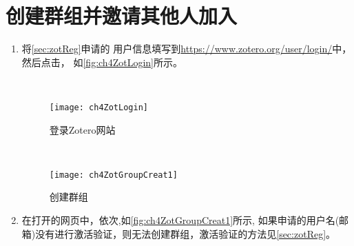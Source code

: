 \documentclass[theorem=false,mathfont=none,openany,sub3section]{easybook}
\begin{document}
\section{创建群组并邀请其他人加入}\label{sec:CreatGroup}
\begin{enumerate}
	\item    将\cref{sec:zotReg}申请的
	用户信息填写到\url{https://www.zotero.org/user/login/}中，
	然后点击，
	如\autoref{fig:ch4ZotLogin}所示\label{page:zoteroLogin}。
	\begin{figure}[htbp]
		\centering\
		\begin{minipage}[t]{0.6\linewidth}
			\centering
			\texttt{[image: ch4ZotLogin]}
			\caption{登录Zotero网站}
			\label{fig:ch4ZotLogin}
		\end{minipage}
		\centering\
		\begin{minipage}[t]{0.3\linewidth}
			\centering
			\texttt{[image: ch4ZotGroupCreat1]}
			\caption{创建群组}
			\label{fig:ch4ZotGroupCreat1}
		\end{minipage}
	\end{figure}
	
	\item 在打开的网页中，依次,如\autoref{fig:ch4ZotGroupCreat1}所示,
	如果申请的用户名(邮箱)没有进行激活验证，则无法创建群组，激活验证的方法见\cref{sec:zotReg}。
	

\end{enumerate}
\end{document}
